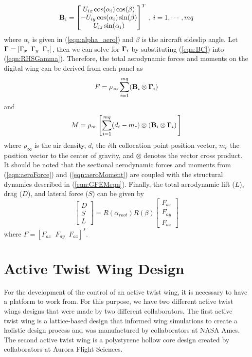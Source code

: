 \documentclass[11pt]{ucthesis}
\begin{document}
\begin{equation}
{\bf B}_{i} = \begin{bmatrix}U_{ix}\cos(\alpha_{i})\cos(\beta)\\ -U_{iy}\cos(\alpha_{i})\sin(\beta)\\ U_{iz}\sin(\alpha_{i})\end{bmatrix}^T \,,\;i=1,\cdots,mq
\label{eqn:BC}
\end{equation}
where $\alpha_i$ is given in (\ref{eqn:alpha_aero}) and $\beta$ is the aircraft sideslip angle. Let ${\bf \Gamma} = [\Gamma_x \;\; \Gamma_y \;\;\Gamma_z]$, then we can solve for ${\bf \Gamma}_i$ by substituting (\ref{eqn:BC}) into (\ref{eqn:RHSGamma}). Therefore, the total aerodynamic forces and moments on the digital wing can be derived from each panel as %
\begin{equation}
F = \rho_{\infty} \sum_{i=1}^{mq} ({\bf B}_i \otimes {\bf \Gamma}_i)
\label{eqn:aeroForce}
\end{equation}
and
\begin{equation}
M = \rho_{\infty} \left [ \sum_{i=1}^{mq} (d_i-m_c) \otimes ({\bf B}_i \otimes {\bf \Gamma}_i)\,\right ]
\label{eqn:aeroMoment}
\end{equation}
where $\rho_{\infty}$ is the air density, $d_i$ the $i$th collocation point position vector, $m_c$ the position vector to the center of gravity, and $\otimes$ denotes the vector cross product. It should be noted that the sectional aerodynamic forces and moments from (\ref{eqn:aeroForce}) and (\ref{eqn:aeroMoment}) are coupled with the structural dynamics described in (\ref{eqn:GFEMeqn}). Finally, the total aerodynamic lift ($L$), drag ($D$), and lateral force ($S$) can be given by 
\begin{equation}
\begin{bmatrix}D\\S\\L\end{bmatrix} = R(\alpha_{root})R(\beta)\begin{bmatrix}F_{ax}\\F_{ay}\\F_{az}\end{bmatrix}
\label{eqn:LDS}
\end{equation}
where $F = [F_{ax} \;\;F_{ay} \;\; F_{az}]^{T}$.   

\chapter{Active Twist Wing Design}
For the development of the control of an active twist wing, it is necessary to have a platform to work from. For this purpose, we have two different active twist wings designs that were made by two different collaborators. The first active twist wing is a lattice-based design that informed wing simulations to create a holistic design process and was manufactured by collaborators at NASA Ames. The second active twist wing is a polystyrene hollow core design created by collaborators at Aurora Flight Sciences.
\end{document}
